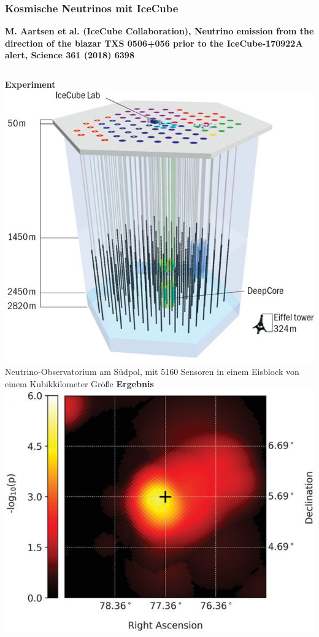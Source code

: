 \documentclass[10pt,t]{beamer}
\begin{document}
\begin{frame}
\frametitle{Kosmische Neutrinos mit IceCube}
\vspace*{-2.6\baselineskip}
\alert{\bfseries\footnotesize M. Aartsen et al. (IceCube Collaboration), Neutrino emission from the direction of the blazar TXS 0506+056 prior to the IceCube-170922A alert, Science 361 (2018) 6398 \cite{IceCube}}
\vspace*{\baselineskip}
\begin{columns}
\textbf{Experiment} \\[1ex]
    \includegraphics[width=\textwidth]{icecube-experiment} \\
    Neutrino-Observatorium am Südpol, mit 5160 Sensoren in einem Eisblock von einem Kubikkilometer Größe
\textbf{Ergebnis} \\[1ex]
    \includegraphics[width=\textwidth]{icecube-ergebnis} \\

\end{columns}
\end{frame}
\end{document}
